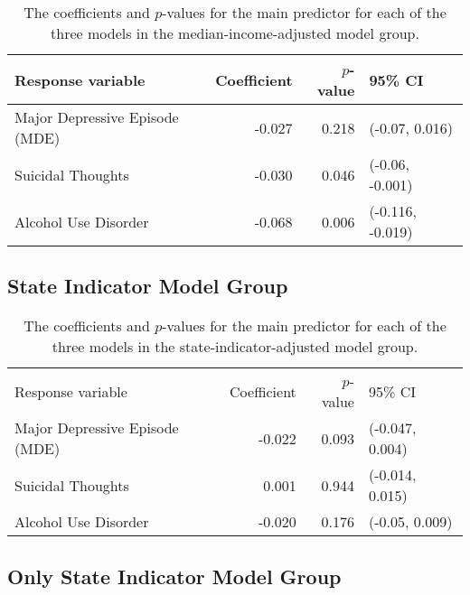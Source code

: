 \documentclass{article}
\begin{document}
\begin{table}[!htb]
\begin{center}
\begin{tabular}{l r r l}
    \hline
    Response variable & Coefficient & $p$-value & 95\% CI\\
    \hline
    Major Depressive Episode (MDE) & -0.027 & 0.218 & (-0.07, 0.016)\\
    Suicidal Thoughts & -0.030 & 0.046 & (-0.06, -0.001)\\
    Alcohol Use Disorder & -0.068 & 0.006 & (-0.116, -0.019)\\
    \hline
\end{tabular}
\caption{\label{tab:median-income-model-results} The coefficients and $p$-values
    for the main predictor for each of the three models
    in the median-income-adjusted model group.
}
\end{center}
\end{table}

\subsection{State Indicator Model Group}

\begin{table}[!htb]
\begin{center}
\begin{tabular}{l r r l}
    \hline
    Response variable & Coefficient & $p$-value & 95\% CI\\
    Major Depressive Episode (MDE) & -0.022 & 0.093 & (-0.047, 0.004)\\
    Suicidal Thoughts & 0.001 & 0.944 & (-0.014, 0.015)\\
    Alcohol Use Disorder & -0.020 & 0.176 & (-0.05, 0.009)\\
    \hline
\end{tabular}
\caption{\label{tab:state-ind-model-results} The coefficients and $p$-values
    for the main predictor for each of the three models
    in the state-indicator-adjusted model group.
}
\end{center}
\end{table}

\subsection{Only State Indicator Model Group}
\end{document}
